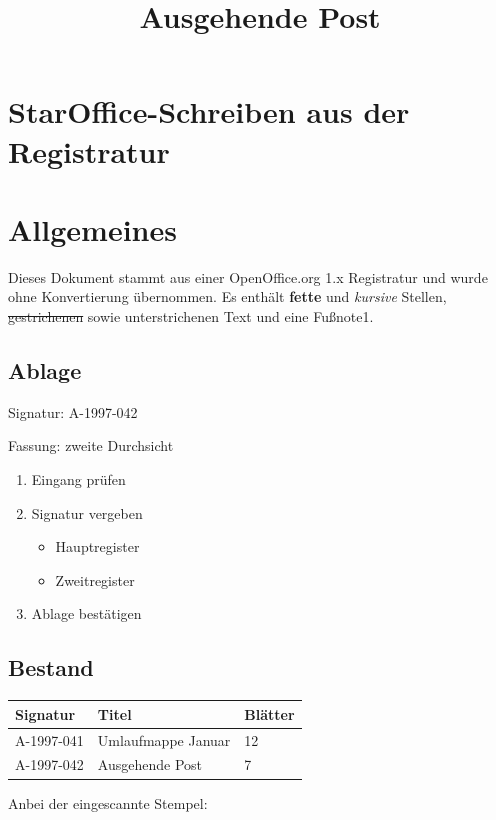 \documentclass[11pt,a4paper]{article}
\title{Ausgehende Post}
\begin{document}
\maketitle

\section{StarOffice-Schreiben aus der Registratur}

\section{Allgemeines}

Dieses Dokument stammt aus einer OpenOffice.org 1.x Registratur und wurde ohne Konvertierung übernommen. Es enthält \textbf{fette} und \textit{kursive} Stellen, \sout{gestrichenen} sowie unterstrichenen Text und eine Fußnote1.

\subsection{Ablage}

Signatur:	A-1997-042

Fassung:	zweite  Durchsicht

\begin{enumerate}
\item Eingang prüfen
\item Signatur vergeben
  \begin{itemize}
\item Hauptregister
\item Zweitregister
  \end{itemize}
\item Ablage bestätigen
\end{enumerate}

\subsection{Bestand}

\begin{table}[h]
\begin{tabular}{|l|l|l|}
\hline
Signatur & Titel & Blätter \\ \hline
A-1997-041 & Umlaufmappe Januar & 12 \\ \hline
A-1997-042 & Ausgehende Post & 7 \\ \hline
\end{tabular}
\end{table}

Anbei der eingescannte Stempel:
\end{document}
